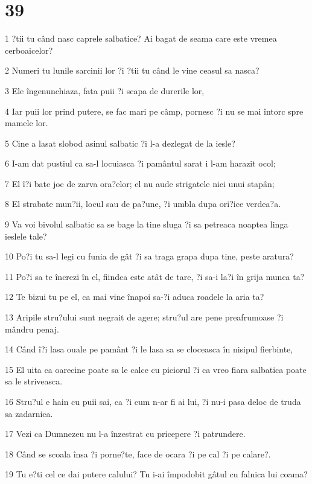 \chapter{39}

\par 1 ?tii tu când nasc caprele salbatice? Ai bagat de seama care este vremea cerboaicelor?
\par 2 Numeri tu lunile sarcinii lor ?i ?tii tu când le vine ceasul sa nasca?
\par 3 Ele îngenunchiaza, fata puii ?i scapa de durerile lor,
\par 4 Iar puii lor prind putere, se fac mari pe câmp, pornesc ?i nu se mai întorc spre mamele lor.
\par 5 Cine a lasat slobod asinul salbatic ?i l-a dezlegat de la iesle?
\par 6 I-am dat pustiul ca sa-l locuiasca ?i pamântul sarat i l-am harazit ocol;
\par 7 El î?i bate joc de zarva ora?elor; el nu aude strigatele nici unui stapân;
\par 8 El strabate mun?ii, locul sau de pa?une, ?i umbla dupa ori?ice verdea?a.
\par 9 Va voi bivolul salbatic sa se bage la tine sluga ?i sa petreaca noaptea linga ieslele tale?
\par 10 Po?i tu sa-l legi cu funia de gât ?i sa traga grapa dupa tine, peste aratura?
\par 11 Po?i sa te încrezi în el, fiindca este atât de tare, ?i sa-i la?i în grija munca ta?
\par 12 Te bizui tu pe el, ca mai vine înapoi sa-?i aduca roadele la aria ta?
\par 13 Aripile stru?ului sunt negrait de agere; stru?ul are pene preafrumoase ?i mândru penaj.
\par 14 Când î?i lasa ouale pe pamânt ?i le lasa sa se cloceasca în nisipul fierbinte,
\par 15 El uita ca oarecine poate sa le calce cu piciorul ?i ca vreo fiara salbatica poate sa le striveasca.
\par 16 Stru?ul e hain cu puii sai, ca ?i cum n-ar fi ai lui, ?i nu-i pasa deloc de truda sa zadarnica.
\par 17 Vezi ca Dumnezeu nu l-a înzestrat cu pricepere ?i patrundere.
\par 18 Când se scoala însa ?i porne?te, face de ocara ?i pe cal ?i pe calare?.
\par 19 Tu e?ti cel ce dai putere calului? Tu i-ai împodobit gâtul cu falnica lui coama?
